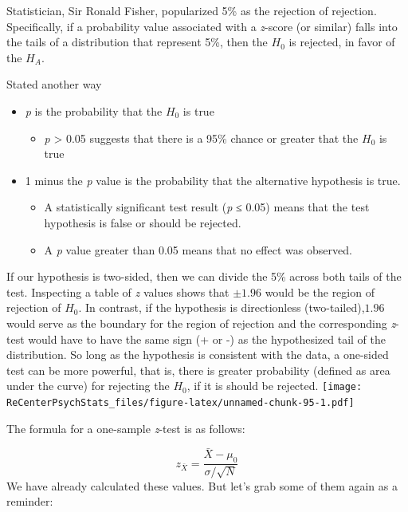 \documentclass[
  11pt,
]{book}
\providecommand{\tightlist}{%
  \setlength{\itemsep}{0pt}\setlength{\parskip}{0pt}}
\begin{document}
Statistician, Sir Ronald Fisher, popularized 5\% as the rejection of rejection. Specifically, if a probability value associated with a \emph{z}-score (or similar) falls into the tails of a distribution that represent 5\%, then the \(H_0\) is rejected, in favor of the \(H_A\).

Stated another way

\begin{itemize}
\tightlist
\item
  \emph{p} is the probability that the \(H_0\) is true

  \begin{itemize}
  \tightlist
  \item
    \emph{p} \textgreater{} 0.05 suggests that there is a 95\% chance or greater that the \(H_0\) is true
  \end{itemize}
\item
  1 minus the \emph{p} value is the probability that the alternative hypothesis is true.

  \begin{itemize}
  \tightlist
  \item
    A statistically significant test result (\emph{p} ≤ 0.05) means that the test hypothesis is false or should be rejected.
  \item
    A \emph{p} value greater than 0.05 means that no effect was observed.
  \end{itemize}
\end{itemize}

If our hypothesis is two-sided, then we can divide the 5\% across both tails of the test. Inspecting a table of \emph{z} values shows that \(\pm 1.96\) would be the region of rejection of \(H_0\). In contrast, if the hypothesis is directionless (two-tailed),\(1.96\) would serve as the boundary for the region of rejection and the corresponding \emph{z}-test would have to have the same sign (+ or -) as the hypothesized tail of the distribution. So long as the hypothesis is consistent with the data, a one-sided test can be more powerful, that is, there is greater probability (defined as area under the curve) for rejecting the \(H_0\), if it is should be rejected.
\texttt{[image: ReCenterPsychStats\_files/figure-latex/unnamed-chunk-95-1.pdf]}

The formula for a one-sample \emph{z}-test is as follows:

\[
z_{\bar{X}} =  \frac{\bar{X} - \mu_0}{\sigma / \sqrt{N}}
\]
We have already calculated these values. But let's grab some of them again as a reminder:
\end{document}
